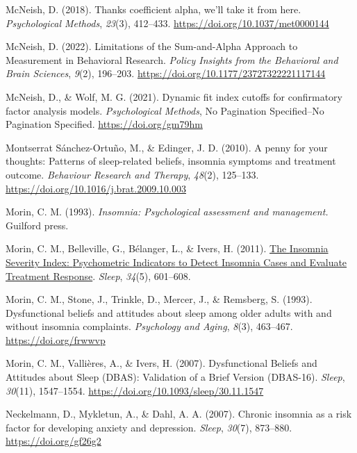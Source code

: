 \documentclass[
  ,doc,11pt, twoside,floatsintext]{apa6}
\newlength{\cslhangindent}
\newlength{\cslentryspacingunit} %
\newenvironment{CSLReferences}[2] %
 {%
  \setlength{\parindent}{0pt}
  \ifodd #1
  \let\oldpar\par
  \def\par{\hangindent=\cslhangindent\oldpar}
  \fi
  \setlength{\parskip}{#2\cslentryspacingunit}
 }%
 {}
\begin{document}
\begin{CSLReferences}{1}{0}
\leavevmode{}%
McNeish, D. (2018). Thanks coefficient alpha, we'll take it from here. \emph{Psychological Methods}, \emph{23}(3), 412--433. \url{https://doi.org/10.1037/met0000144}

\leavevmode{}%
McNeish, D. (2022). Limitations of the {Sum-and-Alpha Approach} to {Measurement} in {Behavioral Research}. \emph{Policy Insights from the Behavioral and Brain Sciences}, \emph{9}(2), 196--203. \url{https://doi.org/10.1177/23727322221117144}

\leavevmode{}%
McNeish, D., \& Wolf, M. G. (2021). Dynamic fit index cutoffs for confirmatory factor analysis models. \emph{Psychological Methods}, No Pagination Specified--No Pagination Specified. \url{https://doi.org/gm79hm}

\leavevmode{}%
Montserrat Sánchez-Ortuño, M., \& Edinger, J. D. (2010). A penny for your thoughts: {Patterns} of sleep-related beliefs, insomnia symptoms and treatment outcome. \emph{Behaviour Research and Therapy}, \emph{48}(2), 125--133. \url{https://doi.org/10.1016/j.brat.2009.10.003}

\leavevmode{}%
Morin, C. M. (1993). \emph{Insomnia: Psychological assessment and management.} Guilford press.

\leavevmode{}%
Morin, C. M., Belleville, G., Bélanger, L., \& Ivers, H. (2011). \href{https://www.ncbi.nlm.nih.gov/pmc/articles/PMC3079939}{The {Insomnia Severity Index}: {Psychometric Indicators} to {Detect Insomnia Cases} and {Evaluate Treatment Response}}. \emph{Sleep}, \emph{34}(5), 601--608.

\leavevmode{}%
Morin, C. M., Stone, J., Trinkle, D., Mercer, J., \& Remsberg, S. (1993). Dysfunctional beliefs and attitudes about sleep among older adults with and without insomnia complaints. \emph{Psychology and Aging}, \emph{8}(3), 463--467. \url{https://doi.org/frwwvp}

\leavevmode{}%
Morin, C. M., Vallières, A., \& Ivers, H. (2007). Dysfunctional {Beliefs} and {Attitudes} about {Sleep} ({DBAS}): {Validation} of a {Brief Version} ({DBAS-16}). \emph{Sleep}, \emph{30}(11), 1547--1554. \url{https://doi.org/10.1093/sleep/30.11.1547}

\leavevmode{}%
Neckelmann, D., Mykletun, A., \& Dahl, A. A. (2007). Chronic insomnia as a risk factor for developing anxiety and depression. \emph{Sleep}, \emph{30}(7), 873--880. \url{https://doi.org/gf26g2}


\end{CSLReferences}
\end{document}
